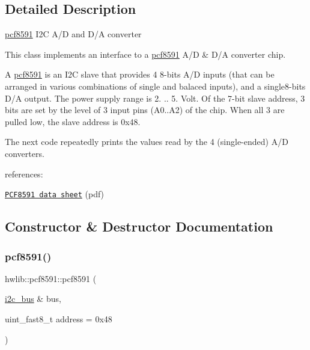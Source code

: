 \subsection{Detailed Description}
\hyperlink{classhwlib_1_1pcf8591}{pcf8591} I2C A/D and D/A converter

This class implements an interface to a \hyperlink{classhwlib_1_1pcf8591}{pcf8591} A/D \& D/A converter chip.



A \hyperlink{classhwlib_1_1pcf8591}{pcf8591} is an I2C slave that provides 4 8-\/bits A/D inputs (that can be arranged in various combinations of single and balaced inputs), and a single8-\/bits D/A output. The power supply range is 2. .. 5. Volt. Of the 7-\/bit slave address, 3 bits are set by the level of 3 input pins (A0..A2) of the chip. When all 3 are pulled low, the slave address is 0x48.

The next code repeatedly prints the values read by the 4 (single-\/ended) A/D converters.


\begin{DoxyCodeInclude}
\end{DoxyCodeInclude}
 references\+:
\begin{DoxyItemize}
\item \href{http://www.nxp.com/documents/data_sheet/PCF8591.pdf}{\tt P\+C\+F8591 data sheet} (pdf) 
\end{DoxyItemize}

\subsection{Constructor \& Destructor Documentation}
\mbox{\label{classhwlib_1_1pcf8591_abcaa1f0b67d70cd95754fd02a939240b}} 
\subsubsection{\texorpdfstring{pcf8591()}{pcf8591()}}
{\footnotesize\ttfamily hwlib\+::pcf8591\+::pcf8591 (\begin{DoxyParamCaption}\item[{\hyperlink{classhwlib_1_1i2c__bus}{i2c\+\_\+bus} \&}]{bus,  }\item[{uint\+\_\+fast8\+\_\+t}]{address = {\ttfamily 0x48} }\end{DoxyParamCaption})\hspace{0.3cm}{\ttfamily [inline]}}

